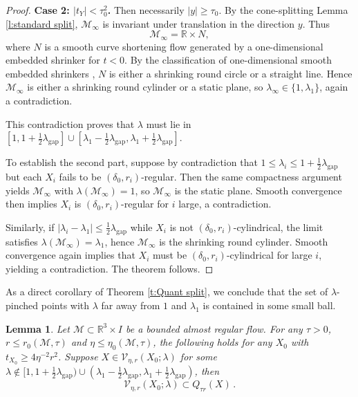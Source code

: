 \documentclass[11pt,reqno]{amsart}
\numberwithin{equation}{section}
\newcommand{\RR}{\mathds{R}}
\newcommand{\cM}{\mathcal{M}}
\newcommand{\cV}{\mathcal{V}}
\newtheorem{lemma}[equation]{Lemma}
\theoremstyle{definition}
\theoremstyle{remark}
\theoremstyle{remark}
\theoremstyle{remark}
\theoremstyle{remark}\newtheorem{conjecture}[equation]{Conjecture}
\theoremstyle{remark}\newtheorem{question}[equation]{Question}
\begin{document}
\begin{proof}
\medskip\noindent
\textbf{Case 2: $|t_Y|<\tau_0^2$.}  
Then necessarily $|y|\ge\tau_0$. By the cone-splitting Lemma \ref{l:standard split}, $\cM_\infty$ is invariant under translation in the direction $y$. Thus
\[
\cM_\infty = \RR \times N,
\]
where $N$ is a smooth curve shortening flow generated by a one-dimensional embedded shrinker for $t<0$. By the classification of one-dimensional smooth embedded shrinkers \cite{AL86}, $N$ is either a shrinking round circle or a straight line. Hence $\cM_\infty$ is either a shrinking round cylinder or a static plane, so $\lambda_\infty\in\{1,\lambda_1\}$, again a contradiction.

This contradiction proves that $\lambda$ must lie in $[1,1+\frac{1}{2}\lambda_{\mathrm{gap}}]\cup[\lambda_1-\frac{1}{2}\lambda_{\mathrm{gap}},\lambda_1+\frac{1}{2}\lambda_{\mathrm{gap}}]$.

To establish the second part, suppose by contradiction that $1\le\lambda_i\le1+\frac{1}{2}\lambda_{\mathrm{gap}}$ but each $X_i$ fails to be $(\delta_0,r_i)$-regular. Then the same compactness argument yields $\cM_\infty$ with $\lambda(\cM_\infty)=1$, so $\cM_\infty$ is the static plane. Smooth convergence then implies $X_i$ is $(\delta_0,r_i)$-regular for $i$ large, a contradiction.

Similarly, if $|\lambda_i-\lambda_1|\le \frac{1}{2}\lambda_{\mathrm{gap}}$ while $X_i$ is not $(\delta_0,r_i)$-cylindrical, the limit satisfies $\lambda(\cM_\infty)=\lambda_1$, hence $\cM_\infty$ is the shrinking round cylinder. Smooth convergence again implies that $X_i$ must be $(\delta_0,r_i)$-cylindrical for large $i$, yielding a contradiction. The theorem follows.
\end{proof}




As a direct corollary of Theorem \ref{t:Quant split}, we conclude that the set of $\lambda$-pinched points with $\lambda$ far away from $1$ and $\lambda_1$ is contained in some small ball.

\begin{lemma}\label{l:pinched points near axis}
Let $\cM \subset \RR^3 \times I$ be a bounded almost regular flow. For any $\tau>0$, $r\le r_0(\cM,\tau)$ and $\eta\le \eta_0(\cM,\tau)$, the following holds for any $X_0$ with $t_{X_0} \ge 4\eta^{-2}r^2$. Suppose $ X\in \cV_{\eta,r}(X_0;\lambda)$ for some $\lambda \notin [1,1+\frac{1}{2}\lambda_{\mathrm{gap}})\cup(\lambda_1-\frac{1}{2}\lambda_{\mathrm{gap}},\lambda_1+\frac{1}{2}\lambda_{\mathrm{gap}})$, then
\begin{equation*}
    \cV_{\eta,r}(X_0;\lambda) \subset Q_{\tau r}(X)\,.
\end{equation*}
\end{lemma}
\end{document}
